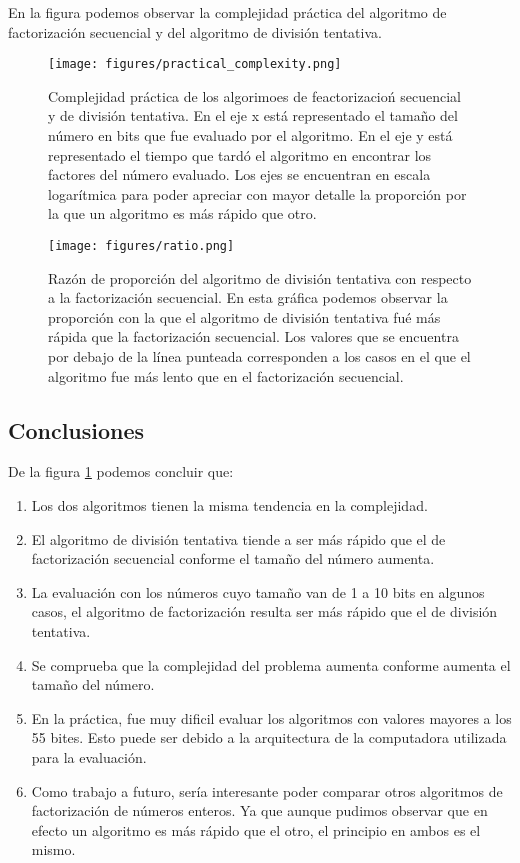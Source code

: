 \documentclass{article}
\begin{document}
En la figura podemos observar la complejidad práctica del algoritmo de
factorización secuencial y del algoritmo de división tentativa.

\begin{figure}[H]
        \texttt{[image: figures/practical\_complexity.png]}
\caption{Complejidad práctica de los algorimoes de feactorizacioń secuencial y
de división tentativa. En el eje x está representado el tamaño del número en
bits que fue evaluado por el algoritmo. En el eje y está representado el tiempo
que tardó el algoritmo en encontrar los factores del número evaluado.
Los ejes se encuentran en escala logarítmica para poder apreciar con mayor
detalle la proporción por la que un algoritmo es más rápido que otro.
    } \label{complejidad}
\end{figure}

\begin{figure}[H]
    \texttt{[image: figures/ratio.png]}
\caption{Razón de proporción del algoritmo de división tentativa con respecto a
la factorización secuencial. En esta gráfica podemos observar la proporción con
la que el algoritmo de división tentativa fué más rápida que la factorización
secuencial. Los valores que se encuentra por debajo de la línea punteada
corresponden a los casos en el que el algoritmo fue más lento que en el
factorización secuencial.
} \label{ratio}
\end{figure}

\subsection{Conclusiones}

De la figura \ref{complejidad} podemos concluir que:

\begin{enumerate}
    \item Los dos algoritmos tienen la misma tendencia en la complejidad.
\item El algoritmo de división tentativa tiende a ser más rápido que el de
factorización secuencial conforme el tamaño del número aumenta.
\item La evaluación con los números cuyo tamaño van de 1 a 10 bits en algunos
casos, el algoritmo de factorización resulta ser más rápido que el de división
tentativa.
\item Se comprueba que la complejidad del problema aumenta conforme aumenta el
tamaño del número.
\item En la práctica, fue muy dificil evaluar los algoritmos con valores mayores
a los 55 bites. Esto puede ser debido a la arquitectura de la computadora
utilizada para la evaluación.
\item Como trabajo a futuro, sería interesante poder comparar otros algoritmos de
factorización de números enteros. Ya que aunque pudimos observar que en efecto
un algoritmo es más rápido que el otro, el principio en ambos es el mismo.

\end{enumerate}
\end{document}
